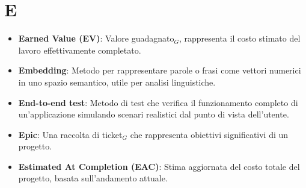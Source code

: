 \section{E}
\begin{itemize}
    \item \textbf{Earned Value (EV)}: Valore guadagnato$_G$, rappresenta il costo stimato del lavoro effettivamente completato.
    \item \textbf{Embedding}: Metodo per rappresentare parole o frasi come vettori numerici in uno spazio semantico, utile per analisi linguistiche.
    \item \textbf{End-to-end test}: Metodo di test che verifica il funzionamento completo di un'applicazione simulando scenari realistici dal punto di vista dell'utente.
    \item \textbf{Epic}: Una raccolta di ticket$_G$ che rappresenta obiettivi significativi di un progetto.
    \item \textbf{Estimated At Completion (EAC)}: Stima aggiornata del costo totale del progetto, basata sull'andamento attuale.
\end{itemize}

